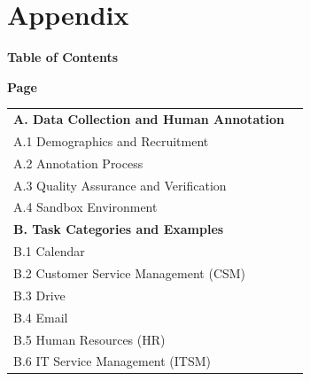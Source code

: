 \appendix
{}
\onecolumn

\section*{\LARGE Appendix}
\vspace{8pt} 

\noindent\textbf{\Large Table of Contents}

\begin{flushright}
    \textbf{Page}
\end{flushright}


\noindent
\renewcommand{\arraystretch}{1.2} %
\begin{tabularx}{\linewidth}{Xr} %
    \textbf{A. Data Collection and Human Annotation} \dotfill & \pageref{app:annotation} \\  
    \hspace{2em} A.1 Demographics and Recruitment \dotfill & \pageref{app:annot_demographics} \\  
    \hspace{2em} A.2 Annotation Process \dotfill & \pageref{app:annot_process} \\  
    \hspace{2em} A.3 Quality Assurance and Verification \dotfill & \pageref{app:annot_qa} \\  
    \hspace{2em} A.4 Sandbox Environment \dotfill & \pageref{app:sandbox} \\  
    \textbf{B. Task Categories and Examples} \dotfill & \pageref{app:categories_sec} \\  
    \hspace{2em} B.1 Calendar \dotfill & \pageref{app:cat_calendar} \\  
    \hspace{2em} B.2 Customer Service Management (CSM) \dotfill & \pageref{app:cat_csm} \\  
    \hspace{2em} B.3 Drive \dotfill & \pageref{app:cat_drive} \\  
    \hspace{2em} B.4 Email \dotfill & \pageref{app:cat_email} \\  
    \hspace{2em} B.5 Human Resources (HR) \dotfill & \pageref{app:cat_hr} \\  
    \hspace{2em} B.6 IT Service Management (ITSM) \dotfill & \pageref{app:cat_itsm} \\  

\end{tabularx}
